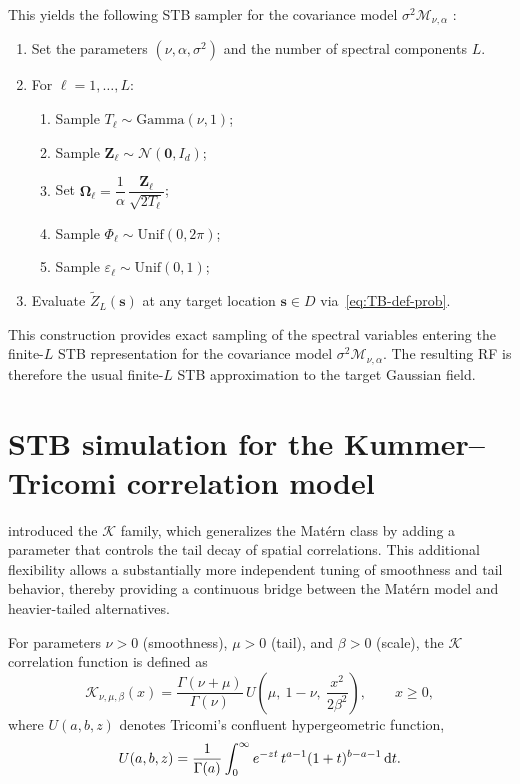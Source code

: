 \documentclass[
  12pt]{article}
\begin{document}
This yields the following STB sampler for the covariance model $\sigma^2\mathcal{M}_{\nu,\alpha}$ \citep{EmeryLantu2006}:
\begin{enumerate}
\item Set the parameters $(\nu,\alpha,\sigma^2)$ and the number of spectral components $L$.
\item For $\ell=1,\ldots,L$:
\begin{enumerate}
\item Sample $T_\ell \sim \mathrm{Gamma}(\nu,1)$;
\item Sample $\mathbf{Z}_\ell \sim \mathcal{N}(\mathbf{0},I_d)$;
\item Set $\boldsymbol{\Omega}_\ell = \dfrac{1}{\alpha}\,\dfrac{\mathbf{Z}_\ell}{\sqrt{2T_\ell}}$;
\item Sample $\Phi_\ell \sim \mathrm{Unif}(0,2\pi)$;
\item Sample $\varepsilon_\ell\sim\mathrm{Unif}(0,1)$;
\end{enumerate}
\item Evaluate $\widetilde Z_L(\mathbf{s})$ at any target location $\mathbf{s}\in D$ via~\eqref{eq:TB-def-prob}.
\end{enumerate}



This construction provides exact sampling of the spectral variables entering the finite-$L$ STB representation for the covariance model $\sigma^2\mathcal{M}_{\nu,\alpha}$.
The resulting RF is therefore the usual finite-$L$ STB approximation to the target Gaussian field.


\section{STB simulation for the Kummer--Tricomi correlation model}
\label{sec4}

\cite{ma2022beyond} introduced the $\mathcal{K}$ family, which generalizes the Mat\'ern class by adding a parameter that controls the tail decay of spatial correlations.
This additional flexibility allows a substantially more independent tuning of smoothness and tail behavior, thereby providing a continuous bridge between the Mat\'ern model and heavier-tailed alternatives.

For parameters $\nu>0$ (smoothness), $\mu>0$ (tail), and $\beta>0$ (scale), the $\mathcal{K}$ correlation function is defined as
\begin{equation}\label{eq:kummer}
\mathcal{K}_{\nu,\mu,\beta}(x)
= \frac{\Gamma(\nu+\mu)}{\Gamma(\nu)}\,
U\!\left(\mu,\ 1-\nu,\ \frac{x^{2}}{2\beta^{2}}\right),
\qquad x \ge 0,
\end{equation}
where $U(a,b,z)$ denotes Tricomi's confluent hypergeometric function,
\[
U(a,b,z)
= \frac{1}{\Gamma(a)} \int_{0}^{\infty}
e^{-z t}\,t^{a-1}(1+t)^{b-a-1}\,{\rm d}t.
\]
\end{document}
